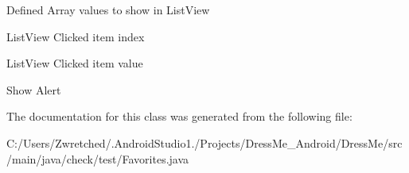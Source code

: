 Defined Array values to show in List\+View

List\+View Clicked item index

List\+View Clicked item value

Show Alert 

The documentation for this class was generated from the following file\+:\begin{DoxyCompactItemize}
\item 
C\+:/\+Users/\+Zwretched/.\+Android\+Studio1./\+Projects/\+Dress\+Me\+\_\+\+Android/\+Dress\+Me/src/main/java/check/test/Favorites.\+java\end{DoxyCompactItemize}
